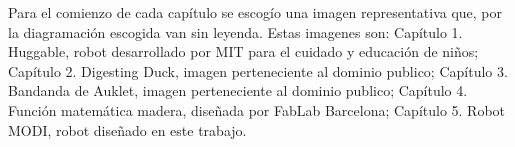 Para el comienzo de cada capítulo se escogío una imagen representativa que, por la diagramación escogida van sin leyenda. Estas imagenes son: Capítulo 1. Huggable, robot desarrollado por MIT para el cuidado y educación de niños; Capítulo 2. Digesting Duck, imagen perteneciente al dominio publico; Capítulo 3. Bandanda de Auklet, imagen perteneciente al dominio publico; Capítulo 4. Función matemática madera, diseñada por FabLab Barcelona; Capítulo 5. Robot MODI, robot diseñado en este trabajo.


